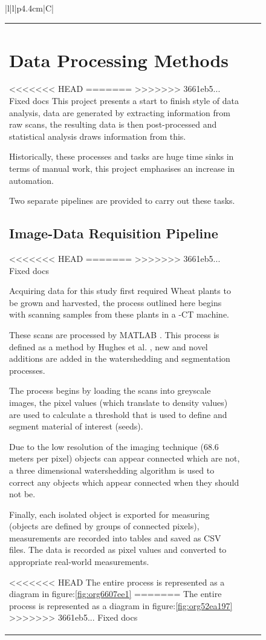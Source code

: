 \documentclass[11pt]{report}
\begin{document}
\begin{figure}[htbp]
{\begin{longtable}{|l|l|p{4.4cm}|C|}
{\begin{longtable}{|l|l|p{14cm}|}
{\section{Data Processing Methods}
<<<<<<< HEAD
\label{sec:org133ce77}
=======
\label{sec:orge90ffdb}
>>>>>>> 3661eb5... Fixed docs
This project presents a start to finish style of data analysis, data are generated by extracting information from raw scans, the resulting data is then post-processed and statistical analysis draws information from this.

Historically, these processes and tasks are huge time sinks in terms of manual work, this project emphasises an increase in automation.

Two separate pipelines are provided to carry out these tasks.

\subsection{Image-Data Requisition Pipeline}
<<<<<<< HEAD
\label{sec:orgffe7d98}
=======
\label{sec:org4cfc8ec}
>>>>>>> 3661eb5... Fixed docs

Acquiring data for this study first required Wheat plants to be grown and harvested, the process outlined here begins with scanning samples from these plants in a \textmu{}-CT machine.

These scans are processed by MATLAB \cite{MATHWORKS2017}. This process is defined as a method by Hughes et al. \cite{Hughes2017}, new and novel additions are added in the watershedding and segmentation processes.

The process begins by loading the scans into greyscale images, the pixel values (which translate to density values) are used to calculate a threshold that is used to define and segment material of interest (seeds).

Due to the low resolution of the imaging technique (68.6\textmu{} meters per pixel) objects can appear connected which are not, a three dimensional watershedding algorithm is used to correct any objects which appear connected when they should not be.

Finally, each isolated object is exported for measuring (objects are defined by groups of connected pixels), measurements are recorded into tables and saved as CSV files. The data is recorded as pixel values and converted to appropriate real-world measurements.

<<<<<<< HEAD
The entire process is represented as a diagram in figure:\ref{fig:org6607ee1}
=======
The entire process is represented as a diagram in figure:\ref{fig:org52ea197}
>>>>>>> 3661eb5... Fixed docs

}
\end{longtable}}
\end{longtable}}
\end{figure}
\end{document}
